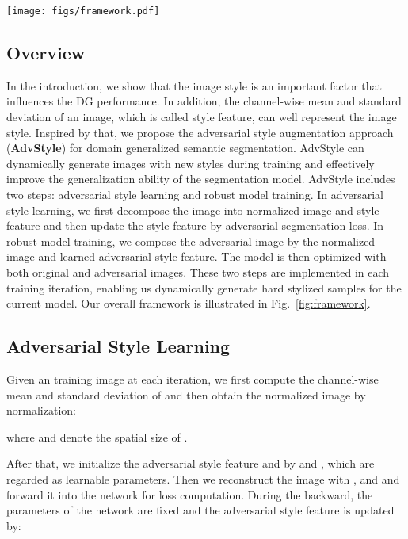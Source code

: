 \documentclass{article}
\newcommand{\ours}{AdvStyle\xspace}
\begin{document}
\begin{figure*}[!t]
\centering
\texttt{[image: figs/framework.pdf]}
\caption{The framework of the proposed adversarial style augmentation.}
\label{fig:framework}
\end{figure*}


\subsection{Overview}

In the introduction, we show that the image style is an important factor that influences the DG performance. In addition, the channel-wise mean and standard deviation of an image, which is called style feature, can well represent the image style. Inspired by that, we propose the adversarial style augmentation approach (\textbf{\ours}) for domain generalized semantic segmentation. \ours can dynamically generate images with new styles during training and effectively improve the generalization ability of the segmentation model. \ours includes two steps: adversarial style learning and robust model training. In adversarial style learning, we first decompose the image into normalized image and style feature and then update the style feature by adversarial segmentation loss. In robust model training, we compose the adversarial image by the normalized image and learned adversarial style feature. The model is then optimized with both original and adversarial images. These two steps are implemented in each training iteration, enabling us dynamically generate hard stylized samples for the current model. Our overall framework is illustrated in Fig.~\ref{fig:framework}.


\subsection{Adversarial Style Learning}

Given an training image  at each iteration, we first compute the channel-wise mean  and standard deviation  of  and then obtain the normalized image  by normalization:

where  and  denote the spatial size of .


After that, we initialize the adversarial style feature  and  by  and , which are regarded as learnable parameters. Then we reconstruct the image with ,  and  and forward it into the network for loss computation. During the backward, the parameters of the network are fixed and the adversarial style feature is updated by:
\end{document}
